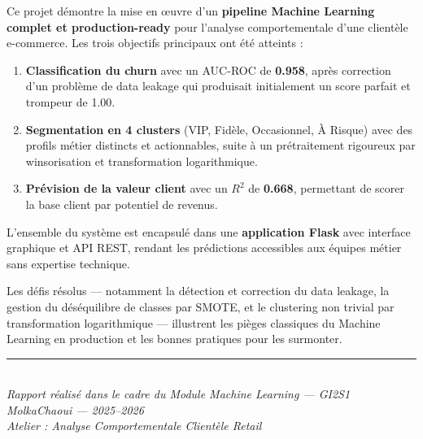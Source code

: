 \documentclass[12pt,a4paper]{article}
\begin{document}
Ce projet démontre la mise en œuvre d'un \textbf{pipeline Machine Learning complet et
production-ready} pour l'analyse comportementale d'une clientèle e-commerce. Les trois
objectifs principaux ont été atteints :

\begin{enumerate}
  \item \textbf{Classification du churn} avec un AUC-ROC de \textbf{0.958}, après correction
        d'un problème de data leakage qui produisait initialement un score parfait et trompeur de 1.00.
  \item \textbf{Segmentation en 4 clusters} (VIP, Fidèle, Occasionnel, À Risque) avec des
        profils métier distincts et actionnables, suite à un prétraitement rigoureux par
        winsorisation et transformation logarithmique.
  \item \textbf{Prévision de la valeur client} avec un $R^2$ de \textbf{0.668}, permettant
        de scorer la base client par potentiel de revenus.
\end{enumerate}

L'ensemble du système est encapsulé dans une \textbf{application Flask} avec interface graphique
et API REST, rendant les prédictions accessibles aux équipes métier sans expertise technique.

Les défis résolus — notamment la détection et correction du data leakage, la gestion du
déséquilibre de classes par SMOTE, et le clustering non trivial par transformation logarithmique —
illustrent les pièges classiques du Machine Learning en production et les bonnes pratiques
pour les surmonter.

\bigskip
\begin{center}
{\color{primary}\rule{0.6\linewidth}{0.8pt}}\\[0.4em]
{\small\itshape
Rapport réalisé dans le cadre du Module Machine Learning — GI2S1 MolkaChaoui — 2025--2026\\
Atelier : Analyse Comportementale Clientèle Retail}
\end{center}
\end{document}
